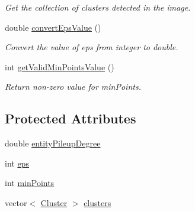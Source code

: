 \begin{DoxyCompactItemize}
\begin{DoxyCompactList}\small\item\em \-Get the collection of clusters detected in the image. \end{DoxyCompactList}\item 
double \hyperlink{classmultiscale_1_1analysis_1_1ClusterDetector_afccb86bfb93df00fff8408faea7a2651}{convert\-Eps\-Value} ()
\begin{DoxyCompactList}\small\item\em \-Convert the value of eps from integer to double. \end{DoxyCompactList}\item 
int \hyperlink{classmultiscale_1_1analysis_1_1ClusterDetector_ab1c2514fb8599f74bf010e81154a9bf7}{get\-Valid\-Min\-Points\-Value} ()
\begin{DoxyCompactList}\small\item\em \-Return non-\/zero value for min\-Points. \end{DoxyCompactList}\end{DoxyCompactItemize}
\subsection*{\-Protected \-Attributes}
\begin{DoxyCompactItemize}
\item 
double \hyperlink{classmultiscale_1_1analysis_1_1ClusterDetector_aaa93a4b3a5a3c4279aa434669093ac40}{entity\-Pileup\-Degree}
\item 
int \hyperlink{classmultiscale_1_1analysis_1_1ClusterDetector_a61e876f87d62245eada8f56d587d39cd}{eps}
\item 
int \hyperlink{classmultiscale_1_1analysis_1_1ClusterDetector_aa94df1adc462be5931ec25ba24122fe9}{min\-Points}
\item 
vector$<$ \hyperlink{classmultiscale_1_1analysis_1_1Cluster}{\-Cluster} $>$ \hyperlink{classmultiscale_1_1analysis_1_1ClusterDetector_aa81a8649bc743389c2fc1919d47eb5b3}{clusters}
\end{DoxyCompactItemize}
